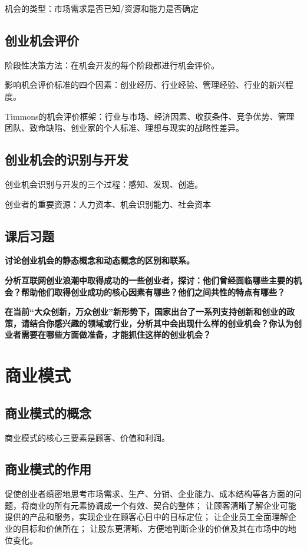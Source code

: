 \documentclass[a4paper, UTF8]{ctexart}
\begin{document}
		机会的类型：市场需求是否已知/资源和能力是否确定

	\subsection{创业机会评价}
		阶段性决策方法：在机会开发的每个阶段都进行机会评价。

		影响机会评价标准的四个因素：创业经历、行业经验、管理经验、行业的新兴程度。

		Timmons的机会评价框架：行业与市场、经济因素、收获条件、竞争优势、管理团队、致命缺陷、创业家的个人标准、理想与现实的战略性差异。

	\subsection{创业机会的识别与开发}
		创业机会识别与开发的三个过程：感知、发现、创造。

		创业者的重要资源：人力资本、机会识别能力、社会资本

	\subsection{课后习题}
		\textbf{讨论创业机会的静态概念和动态概念的区别和联系。}

		\textbf{分析互联网创业浪潮中取得成功的一些创业者，探讨：他们曾经面临哪些主要的机会？帮助他们取得创业成功的核心因素有哪些？他们之间共性的特点有哪些？}

		\textbf{在当前“大众创新，万众创业”新形势下，国家出台了一系列支持创新和创业的政策，请结合你感兴趣的领域或行业，分析其中会出现什么样的创业机会？你认为创业者需要在哪些方面做准备，才能抓住这样的创业机会？}

\section{商业模式}
	\subsection{商业模式的概念}
		商业模式的核心三要素是顾客、价值和利润。

	\subsection{商业模式的作用}
		促使创业者缜密地思考市场需求、生产、分销、企业能力、成本结构等各方面的问题，将商业的所有元素协调成一个有效、契合的整体；
		让顾客清晰了解企业可能提供的产品和服务，实现企业在顾客心目中的目标定位；
		让企业员工全面理解企业的目标和价值所在；
		让股东更清晰、方便地判断企业的价值及其在市场中的地位变化。
\end{document}

